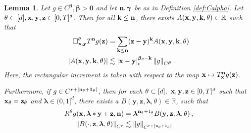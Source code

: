 \documentclass[12pt]{article}
\numberwithin{equation}{section}
\theoremstyle{plain}
\newtheorem{lemma}[theorem]{Lemma}
\theoremstyle{definition}
\newcommand{\abs}[1]{\left\vert #1 \right\vert}
\newcommand{\compAbs}[1]{\left\vert#1\right\vert_{\text{c}}}
\newcommand{\norm}[1]{\left\Vert #1\right\Vert}
\def\bR{\mathbb{R}}\def\bS{\mathbb{S}}
\def\fk{\mathbf k}\def\fl{\mathbf l}
\def\fy{\mathbf y}\def\fz{\mathbf z}
\def\fbeta{{\boldsymbol\beta}}
\def\fgamma{{\boldsymbol\gamma}}
\def\flambda{{\boldsymbol\lambda}}
\def\foo{{\boldsymbol 0}}
\def\fone{{\boldsymbol 1}}
\begin{document}
\begin{lemma}\label{lem:TaylorRecIncrement}
    Let $g\in C^{\fbeta}, \fbeta>\foo$ and let $\fn,\fgamma$ be as in Definition \ref{def:Calpha}. Let $\theta\subset[d], \fx,\fy,\fz\in[0,T]^d$. Then for all $\fk\le\fn$, there exists $A(\fx,\fy,\fk,\theta)\in\bR$ such that
    \begin{align}
    \begin{split}\label{ineq:Taylor1}
        \square^\theta_{\fx,\fy} T^{\fn} g(\fz) &= \sum_{\fk\le\fn} (\fz-\fy)^\fk A(\fx,\fy,\fk,\theta)\\
        \abs{A(\fx,\fy,\fk,\theta)} &\lesssim \compAbs{\fx-\fy}^{\fbeta_\theta-\fk}\norm{g}_{C^\fbeta}\,.
        \end{split}
    \end{align}
    Here, the rectangular increment is taken with respect to the map $\fx\mapsto T^\fn_\fx g(\fz)$.
    
    Furthermore, if $g\in C^{r+\abs{\fn_\theta+\fone_\theta}}$, then for each $\theta\subset[d],~\fx,\fy,\fz\in[0,T]^d$ such that $\fx_\theta = \fz_\theta$ and $\flambda\in(0,1]^d$, there exists a $B(\fy,\fz,\flambda,\theta)\in\bR$, such that
    \begin{align}
    \begin{split}\label{ineq:Taylor2}
        R^\theta g(\fx,\flambda*\fy+\fz,\fn) &= \flambda^{\fn_\theta+1_\theta} B(\fy,\fz,\flambda,\theta)\,, \\
        \norm{B(\cdot,\fz,\flambda,\theta)}_{C^r}&\lesssim \norm{g}_{C^{r+\abs{\fn_\theta+\fone_\theta}}}
    \end{split}
    \end{align}
\end{lemma}
\end{document}
